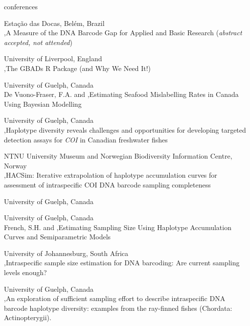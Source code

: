 \begin{revlist}{conferences}
\item {}
  Estação das Docas, Bel\'{e}m, Brazil\\
  \me \sep A Measure of the DNA Barcode Gap for Applied and Basic Research (\textit{abstract accepted, not attended})
\item {}
  University of Liverpool, England\\
  \me \sep The GBADs R Package (and Why We Need It!)
\item {}
  University of Guelph, Canada\\
  \dsup De Vuono-Fraser, F.A. and \me \sep Estimating Seafood Mislabelling Rates in Canada Using Bayesian Modelling
\item {}
  University of Guelph, Canada\\
  \me \sep Haplotype diversity reveals challenges and opportunities for developing
  targeted detection assays for \textit{COI} in Canadian freshwater fishes
\item {}
  NTNU University Museum and Norwegian Biodiversity Information Centre, Norway\\
  \me \sep HACSim: Iterative extrapolation of haplotype accumulation curves for
  assessment of intraspecific COI DNA barcode sampling completeness
\item {}
  University of Guelph, Canada
\item {}
  University of Guelph, Canada\\
  \dsup French, S.H. and \me \sep Estimating Sampling Size Using Haplotype
  Accumulation Curves and Semiparametric Models
\item {}
  University of Johannesburg, South Africa\\
  \me \sep Intraspecific sample size estimation for DNA barcoding: Are current sampling levels enough?
\item {}
  University of Guelph, Canada\\
  \me \sep An exploration of sufficient sampling effort to describe intraspecific
  DNA barcode haplotype diversity: examples from the ray-finned fishes
  (Chordata: Actinopterygii).
\end{revlist}


